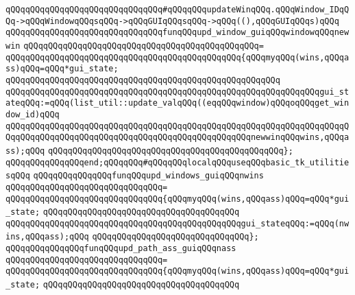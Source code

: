 \newline
\verb|qQQqqQQqqQQqqQQqqQQqqQQqqQQqqQQq#qQQqqQQqupdateWinqQQq.qQQqWindow_IDqQQq->qQQqWindowqQQqsqQQq->qQQqGUIqQQqsqQQq->qQQq((),qQQqGUIqQQqs)qQQq|\newline
\verb|qQQqqQQqqQQqqQQqqQQqqQQqqQQqqQQqfunqQQqupd_window_guiqQQqwindowqQQqnewwin|\newline
\verb|qQQqqQQqqQQqqQQqqQQqqQQqqQQqqQQqqQQqqQQqqQQqqQQq=|\newline
\verb|qQQqqQQqqQQqqQQqqQQqqQQqqQQqqQQqqQQqqQQqqQQqqQQq{qQQqmyqQQq(wins,qQQqass)qQQq=qQQq*gui_state;|\newline
\verb|qQQqqQQqqQQqqQQqqQQqqQQqqQQqqQQqqQQqqQQqqQQqqQQqqQQqqQQq|\newline
\verb|qQQqqQQqqQQqqQQqqQQqqQQqqQQqqQQqqQQqqQQqqQQqqQQqqQQqqQQqqQQqqQQqgui_stateqQQq:=qQQq(list_util::update_valqQQq((eqqQQqwindow)qQQqoqQQqget_window_id)qQQq|\newline
\verb|qQQqqQQqqQQqqQQqqQQqqQQqqQQqqQQqqQQqqQQqqQQqqQQqqQQqqQQqqQQqqQQqqQQqqQQqqQQqqQQqqQQqqQQqqQQqqQQqqQQqqQQqqQQqqQQqqQQqqQQqnewwinqQQqwins,qQQqass);qQQq|\newline
\verb|qQQqqQQqqQQqqQQqqQQqqQQqqQQqqQQqqQQqqQQqqQQqqQQq};|\newline
\newline
\verb|qQQqqQQqqQQqqQQqend;qQQqqQQq#qQQqqQQqlocalqQQquseqQQqbasic_tk_utilitiesqQQq|\newline
\newline
\verb|qQQqqQQqqQQqqQQqfunqQQqupd_windows_guiqQQqnwins|\newline
\verb|qQQqqQQqqQQqqQQqqQQqqQQqqQQqqQQq=|\newline
\verb|qQQqqQQqqQQqqQQqqQQqqQQqqQQqqQQq{qQQqmyqQQq(wins,qQQqass)qQQq=qQQq*gui_state;|\newline
\verb|qQQqqQQqqQQqqQQqqQQqqQQqqQQqqQQqqQQqqQQq|\newline
\verb|qQQqqQQqqQQqqQQqqQQqqQQqqQQqqQQqqQQqqQQqqQQqqQQqgui_stateqQQq:=qQQq(nwins,qQQqass);qQQq|\newline
\verb|qQQqqQQqqQQqqQQqqQQqqQQqqQQqqQQq};|\newline
\newline
\verb|qQQqqQQqqQQqqQQqfunqQQqupd_path_ass_guiqQQqnass|\newline
\verb|qQQqqQQqqQQqqQQqqQQqqQQqqQQqqQQq=|\newline
\verb|qQQqqQQqqQQqqQQqqQQqqQQqqQQqqQQq{qQQqmyqQQq(wins,qQQqass)qQQq=qQQq*gui_state;|\newline
\verb|qQQqqQQqqQQqqQQqqQQqqQQqqQQqqQQqqQQqqQQq|\newline
